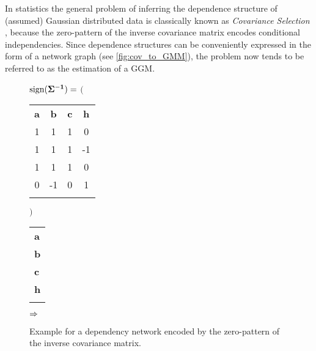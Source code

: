 In statistics the general problem of inferring the dependence structure of (assumed) Gaussian distributed data is classically known as \textit{Covariance Selection} \cite[]{price1972extension}, because the zero-pattern of the inverse covariance matrix encodes conditional independencies. 
Since dependence structures can be conveniently expressed in the form of a network graph (see \autoref{fig:cov_to_GMM}), the problem now tends to be referred to as the estimation of a \gls{GGM}.
\begin{figure}
	\hspace*{2cm}
	$\text{sign}(\mathbf{\Sigma^{-1}})=$
	$\Bigg($
	\begin{tabular}{cccc}
		\textbf{a} & \textbf{b} & \textbf{c} & \textbf{h}\\
		1&1&1&0\\
		1&1&1&-1\\
		1&1&1&0\\
		0&-1&0&1\\
		&&&
	\end{tabular}%
	$\Bigg)$
	\begin{tabular}{l}
		\\
		\textbf{{a}} \\
		\textbf{{b}} \\
		\textbf{{c}} \\
		\textbf{{h}} \\
		\\
	\end{tabular}
	$\Huge\Rightarrow$
\caption{Example for a dependency network encoded by the zero-pattern of the inverse covariance matrix.}
\label{fig:cov_to_GMM}
\end{figure}

